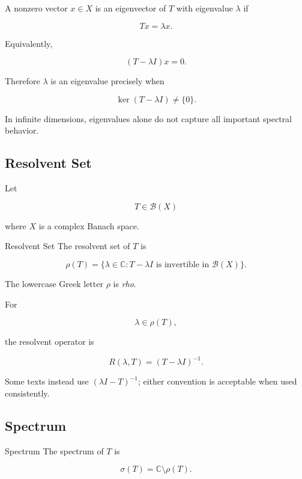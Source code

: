 A nonzero vector \(x\in X\) is an eigenvector of \(T\) with eigenvalue
\(\lambda\) if

\[
\boxed{
Tx=\lambda x.
}
\]

Equivalently,

\[
\boxed{
(T-\lambda I)x=0.
}
\]

Therefore \(\lambda\) is an eigenvalue precisely when

\[
\boxed{
\ker(T-\lambda I)\neq\{0\}.
}
\]

In infinite dimensions, eigenvalues alone do not capture all important
spectral behavior.

\subsection{Resolvent Set}
\label{subsec:resolvent-set}

Let

\[
T\in\mathcal{B}(X)
\]

where \(X\) is a complex Banach space.

\begin{definitionbox}{Resolvent Set}
The resolvent set of \(T\) is

\[
\boxed{
\rho(T)
=
\{
\lambda\in\mathbb{C}:
T-\lambda I
\text{ is invertible in }\mathcal{B}(X)
\}.
}
\]
\end{definitionbox}

The lowercase Greek letter \(\rho\) is \emph{rho}.

For

\[
\lambda\in\rho(T),
\]

the resolvent operator is

\[
\boxed{
R(\lambda,T)
=
(T-\lambda I)^{-1}.
}
\]

Some texts instead use \((\lambda I-T)^{-1}\); either convention is
acceptable when used consistently.

\subsection{Spectrum}
\label{subsec:operator-spectrum}

\begin{definitionbox}{Spectrum}
The spectrum of \(T\) is

\[
\boxed{
\sigma(T)
=
\mathbb{C}\setminus\rho(T).
}
\]
\end{definitionbox}

